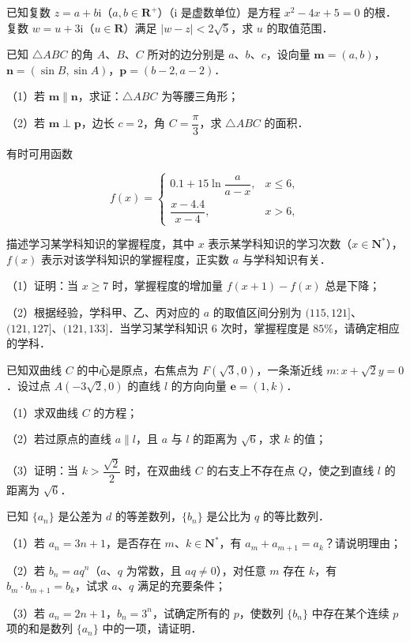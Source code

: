 \begin{question}
已知复数 $z=a+b\mathrm i$（$a,b\in\mathbf R^+$）（$\mathrm i$ 是虚数单位）是方程 $x^2-4x+5=0$ 的根．复数 $w=u+3\mathrm i$（$u\in\mathbf R$）满足 $|w-z|<2\sqrt5$，求 $u$ 的取值范围．

\end{question}
\begin{question}
已知 $\triangle ABC$ 的角 $A$、$B$、$C$ 所对的边分别是 $a$、$b$、$c$，设向量 $\boldsymbol m=(a,b)$，$\boldsymbol n=(\sin B,\sin A)$，$\boldsymbol p=(b-2,a-2)$．

（1）若 $\boldsymbol m\parallel\boldsymbol n$，求证：$\triangle ABC$ 为等腰三角形；

（2）若 $\boldsymbol m\perp\boldsymbol p$，边长 $c=2$，角 $C=\dfrac{\pi}{3}$，求 $\triangle ABC$ 的面积．

\end{question}
\begin{question}
有时可用函数

\nopagebreak[4]
\[f(x)=\begin{cases}0.1+15\ln\dfrac{a}{a-x},&x\leqslant6,\\[6pt] \dfrac{x-4.4}{x-4},&x>6,\end{cases}\]

描述学习某学科知识的掌握程度，其中 $x$ 表示某学科知识的学习次数（$x\in\mathbf N^*$），$f(x)$ 表示对该学科知识的掌握程度，正实数 $a$ 与学科知识有关．

（1）证明：当 $x\geqslant7$ 时，掌握程度的增加量 $f(x+1)-f(x)$ 总是下降；

（2）根据经验，学科甲、乙、丙对应的 $a$ 的取值区间分别为 $(115,121]$、$(121,127]$、$(121,133]$．当学习某学科知识 $6$ 次时，掌握程度是 $85\%$，请确定相应的学科．

\end{question}
\begin{question}
已知双曲线 $C$ 的中心是原点，右焦点为 $F(\sqrt3,0)$，一条渐近线 $m:x+\sqrt2y=0$．设过点 $A(-3\sqrt2,0)$ 的直线 $l$ 的方向向量 $\boldsymbol e=(1,k)$．

（1）求双曲线 $C$ 的方程；

（2）若过原点的直线 $a\parallel l$，且 $a$ 与 $l$ 的距离为 $\sqrt6$，求 $k$ 的值；

（3）证明：当 $k>\dfrac{\sqrt2}{2}$ 时，在双曲线 $C$ 的右支上不存在点 $Q$，使之到直线 $l$ 的距离为 $\sqrt6$．

\end{question}
\begin{question}
已知 $\{a_n\}$ 是公差为 $d$ 的等差数列，$\{b_n\}$ 是公比为 $q$ 的等比数列．

（1）若 $a_n=3n+1$，是否存在 $m$、$k\in\mathbf N^*$，有 $a_m+a_{m+1}=a_k$？请说明理由；

（2）若 $b_n=aq^n$（$a$、$q$ 为常数，且 $aq\neq0$），对任意 $m$ 存在 $k$，有 $b_m\cdot b_{m+1}=b_k$，试求 $a$、$q$ 满足的充要条件；

（3）若 $a_n=2n+1$，$b_n=3^n$，试确定所有的 $p$，使数列 $\{b_n\}$ 中存在某个连续 $p$ 项的和是数列 $\{a_n\}$ 中的一项，请证明．

\end{question}